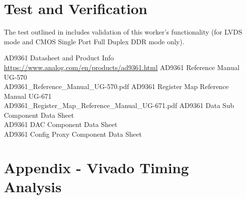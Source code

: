 \documentclass{article}
\begin{document}
\section*{Test and Verification}
The test outlined in \cite{dac_comp_datasheet} includes validation of this worker's functionality (for LVDS mode and CMOS Single Port Full Duplex DDR mode only).
\pagebreak
\begin{thebibliography}{1}

 AD9361 Datasheet and Product Info \\
\url{https://www.analog.com/en/products/ad9361.html}
 AD9361 Reference Manual UG-570\\
AD9361\_Reference\_Manual\_UG-570.pdf
 AD9361 Register Map Reference Manual UG-671\\
AD9361\_Register\_Map\_Reference\_Manual\_UG-671.pdf
  AD9361 Data Sub Component Data Sheet \\
  AD9361 DAC Component Data Sheet \\
  AD9361 Config Proxy Component Data Sheet \\

\end{thebibliography}
\pagebreak

\section{Appendix - Vivado Timing Analysis} \label{appendix}
\end{document}
